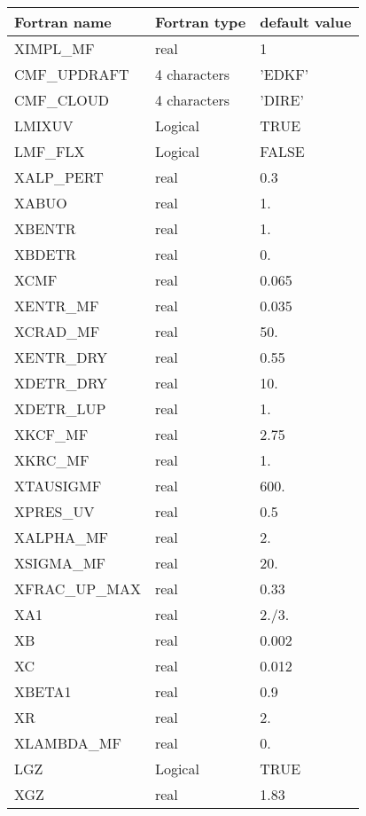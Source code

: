 \begin{center}
\begin{tabular} {|l|l|l|}
\hline
Fortran name & Fortran type & default value \\
\hline
XIMPL\_MF      &  real         &   1        \\
CMF\_UPDRAFT   &  4 characters &   'EDKF'   \\
CMF\_CLOUD     &  4 characters &   'DIRE'   \\
LMIXUV         &  Logical      &    TRUE    \\ 
LMF\_FLX       &  Logical      &    FALSE   \\
XALP\_PERT     &  real         &    0.3     \\
XABUO          &  real         &    1.      \\
XBENTR         &  real         &    1.      \\
XBDETR         &  real         &    0.      \\
XCMF           &  real         &    0.065   \\
XENTR\_MF      &  real         &    0.035   \\
XCRAD\_MF      &  real         &    50.     \\
XENTR\_DRY     &  real         &    0.55    \\
XDETR\_DRY     &  real         &    10.     \\
XDETR\_LUP     &  real         &    1.      \\
XKCF\_MF       &  real         &    2.75    \\
XKRC\_MF       &  real         &    1.      \\
XTAUSIGMF      &  real         &    600.    \\
XPRES\_UV      &  real         &    0.5     \\
XALPHA\_MF     &  real         &    2.      \\
XSIGMA\_MF     &  real         &    20.     \\
XFRAC\_UP\_MAX &  real         &    0.33    \\
XA1            &  real         &    2./3.   \\
XB             &  real         &    0.002   \\
XC             &  real         &    0.012   \\
XBETA1         &  real         &    0.9     \\
XR             &  real         &    2.      \\
XLAMBDA\_MF    &  real         &    0.      \\
LGZ            &  Logical      &    TRUE    \\
XGZ            &  real         &    1.83    \\

\hline

\end{tabular}
\end{center}

